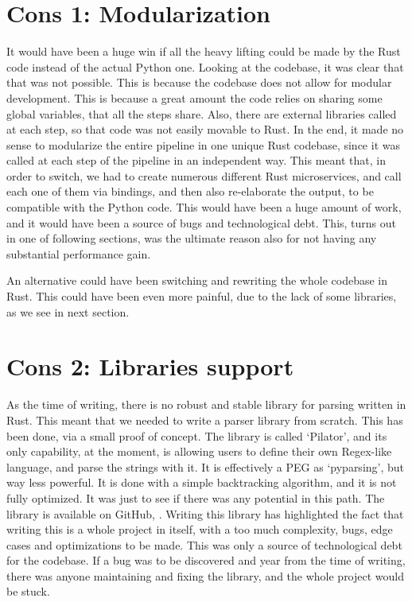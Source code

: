 \section[Modularization]{Cons 1: Modularization}
It would have been a huge win if all the heavy lifting could be made by the Rust
code instead of the actual Python one. Looking at the codebase, it was clear
that that was not possible. This is because the codebase does not allow for modular
development. This is because a great amount the code relies on sharing some
global variables, that all the steps share. Also, there are external libraries called
at each step, so that code was not easily movable to Rust. In the end, it made
no sense to modularize the entire pipeline in one unique Rust codebase, since it
was called at each step of the pipeline in an independent way. This meant that, in
order to switch, we had to create numerous different Rust microservices, and call
each one of them via bindings, and then also re-elaborate the output, to be compatible
with the Python code. This would have been a huge amount of work, and it would have
been a source of bugs and technological debt. This, turns out in one of following
sections, was the ultimate reason also for not having any substantial
performance gain.

An alternative could have been switching and rewriting the whole codebase in
Rust. This could have been even more painful, due to the lack of some libraries,
as we see in next section.

\section[Libraries support]{Cons 2: Libraries support}
As the time of writing, there is no robust and stable library for parsing
written in Rust. This meant that we needed to write a parser library from scratch.
This has been done, via a small proof of concept. The library is called `Pilator',
and its only capability, at the moment, is allowing users to define their own Regex-like
language, and parse the strings with it. It is effectively a PEG as `pyparsing',
but way less powerful. It is done with a simple backtracking algorithm, and it
is not fully optimized. It was just to see if there was any potential in this path.
The library is available on GitHub, \cite{pilator}. Writing this library has
highlighted the fact that writing this is a whole project in itself, with a too much
complexity, bugs, edge cases and optimizations to be made. This was only a
source of technological debt for the codebase. If a bug was to be discovered and
year from the time of writing, there was anyone maintaining and fixing the
library, and the whole project would be stuck.

